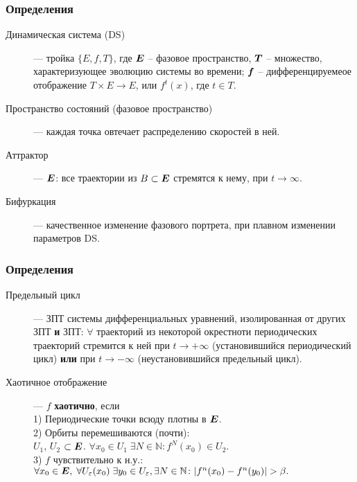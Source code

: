 
\begin{frame}\frametitle{Определения}

\begin{description}
    \item[Динамическая система (DS)] ---  тройка $\{E, f, T\}$, где 
        $\mbox{\boldmath $E$}$ -- фазовое пространство,  
        $\mbox{\boldmath $T$}$ -- множество, характеризующее эволюцию системы во времени;
        $\mbox{\boldmath $f$}$ -- дифференцируемеое отображение $T \times E \to E$, или $f^{t}(x)$, где $t \in T$.
    \item[Пространство состояний (фазовое пространство)] --- каждая точка овтечает распределению скоростей в ней. 
    \item[Аттрактор] ---  $\mbox{\boldmath $E$}$:  все траектории из $B \subset \mbox{\boldmath $E$}$ стремятся к нему, при $t \to \infty$.
    \item[Бифуркация] --- качественное изменение фазового портрета, при плавном изменении параметров DS. 
    
\end{description}

\end{frame}

\begin{frame}
\frametitle{Определения}

\begin{description}
    \item[Предельный цикл] --- ЗПТ системы дифференциальных уравнений, изолированная от других ЗПТ \textbf{и} ЗПТ: $\forall$ траекторий из некоторой окрестноти периодических траекторий стремится к ней при $t \longrightarrow + \infty$ (установившийся периодический цикл) \textbf{или} при $t \longrightarrow - \infty$ (неустановившийся предельный цикл).
    \item[Хаотичное отображение] --- $f$ \textbf{хаотично}, если \\
    1) Периодические точки всюду плотны в $\mbox{\boldmath $E$}$. \\
    2) Орбиты перемешиваются (почти): \\
     $U_1$, $U_2$ $\subset \mbox{\boldmath $E$}$. $ \forall x_0 \in U_1 \; \exists N \in \mathbb{N}: f^N (x_0) \in U_2. $ \\
    3) $f$ чувствительно к н.у.: \\
    $\forall x_0 \in \mbox{\boldmath $E$}, \; \forall U_{\varepsilon}(x_0) \; \exists y_0 \in U_{\varepsilon}, \exists N\in \mathbb{N} \colon |f^n(x_0) - f^n(y_0)| > \beta.$  
\end{description}

\end{frame}